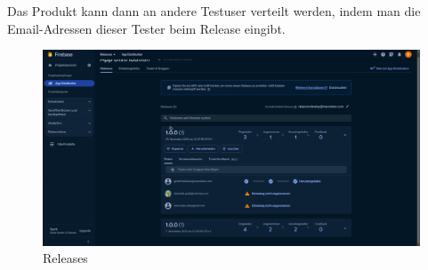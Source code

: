 Das Produkt kann dann an andere Testuser verteilt werden, indem man die Email-Adressen dieser
Tester beim Release eingibt.
\begin{figure}[H]
  \includegraphics[width=\textwidth]{./pics/firebase5.png}
  \caption{Releases}


\end{figure}



